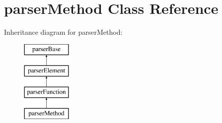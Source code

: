 \hypertarget{classparser_method}{\section{parser\-Method \-Class \-Reference}
\label{classparser_method}
}
\-Inheritance diagram for parser\-Method\-:\begin{figure}[H]
\begin{center}
\leavevmode
\includegraphics[height=4.000000cm]{classparser_method}
\end{center}
\end{figure}
